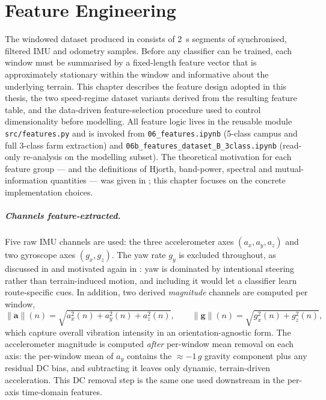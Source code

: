 \chapter{Feature Engineering}
\label{ch:feature}

The windowed dataset produced in  consists of \SI{2}{\second} segments of synchronised, filtered IMU and odometry samples. Before any classifier can be trained, each window must be summarised by a fixed-length feature vector that is approximately stationary within the window and informative about the underlying terrain. This chapter describes the feature design adopted in this thesis, the two speed-regime dataset variants derived from the resulting feature table, and the data-driven feature-selection procedure used to control dimensionality before modelling. All feature logic lives in the reusable module \texttt{src/features.py} and is invoked from \texttt{06\_features.ipynb} (5-class campus and full 3-class farm extraction) and \texttt{06b\_features\_dataset\_B\_3class.ipynb} (read-only re-analysis on the modelling subset). The theoretical motivation for each feature group --- and the definitions of Hjorth, band-power, spectral and mutual-information quantities --- was given in ; this chapter focuses on the concrete implementation choices.

\paragraph{Channels feature-extracted.}
Five raw IMU channels are used: the three accelerometer axes $(a_x, a_y, a_z)$ and two gyroscope axes $(g_x, g_z)$. The yaw rate $g_y$ is excluded throughout, as discussed in  and motivated again in : yaw is dominated by intentional steering rather than terrain-induced motion, and including it would let a classifier learn route-specific cues. In addition, two derived \emph{magnitude} channels are computed per window,
\begin{equation}
    \lVert \mathbf{a}\rVert(n)  = \sqrt{a_x^2(n) + a_y^2(n) + a_z^2(n)},
    \qquad
    \lVert \mathbf{g}\rVert(n)  = \sqrt{g_x^2(n) + g_z^2(n)},
    \label{eq:magnitudes}
\end{equation}
which capture overall vibration intensity in an orientation-agnostic form. The accelerometer magnitude is computed \emph{after} per-window mean removal on each axis: the per-window mean of $a_y$ contains the $\approx{-1}\,g$ gravity component plus any residual DC bias, and subtracting it leaves only dynamic, terrain-driven acceleration. This DC removal step is the same one used downstream in the per-axis time-domain features.

